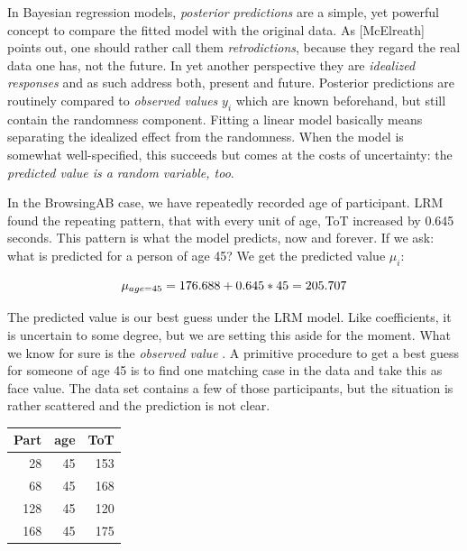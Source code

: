\documentclass[]{svmono}
\newenvironment{Shaded}{\begin{snugshade}}{\end{snugshade}}
\newcommand{\KeywordTok}[1]{\textcolor[rgb]{0.13,0.29,0.53}{\textbf{#1}}}
\newcommand{\DecValTok}[1]{\textcolor[rgb]{0.00,0.00,0.81}{#1}}
\newcommand{\StringTok}[1]{\textcolor[rgb]{0.31,0.60,0.02}{#1}}
\newcommand{\OperatorTok}[1]{\textcolor[rgb]{0.81,0.36,0.00}{\textbf{#1}}}
\newcommand{\NormalTok}[1]{#1}
\theoremstyle{definition}
\theoremstyle{definition}
\theoremstyle{definition}
\theoremstyle{remark}
\begin{document}
In Bayesian regression models, \emph{posterior predictions} are a
simple, yet powerful concept to compare the fitted model with the
original data. As {[}McElreath{]} points out, one should rather call
them \emph{retrodictions}, because they regard the real data one has,
not the future. In yet another perspective they are \emph{idealized
responses} and as such address both, present and future. Posterior
predictions are routinely compared to \emph{observed values} \(y_i\)
which are known beforehand, but still contain the randomness component.
Fitting a linear model basically means separating the idealized effect
from the randomness. When the model is somewhat well-specified, this
succeeds but comes at the costs of uncertainty: the \emph{predicted
value is a random variable, too}.

In the BrowsingAB case, we have repeatedly recorded age of participant.
LRM found the repeating pattern, that with every unit of age, ToT
increased by 0.645 seconds. This pattern is what the model predicts, now
and forever. If we ask: what is predicted for a person of age 45? We get
the predicted value \(\mu_i\):

\[\mu_{age = 45} =176.688 + 0.645 * 45\\ 
= 205.707\]

The predicted value is our best guess under the LRM model. Like
coefficients, it is uncertain to some degree, but we are setting this
aside for the moment. What we know for sure is the \emph{observed value}
. A primitive procedure to get a best guess for someone of age 45 is to
find one matching case in the data and take this as face value. The data
set contains a few of those participants, but the situation is rather
scattered and the prediction is not clear.

\begin{Shaded}
\end{Shaded}

\begin{tabular}{r|r|r}
\hline
Part & age & ToT\\
\hline
28 & 45 & 153\\
\hline
68 & 45 & 168\\
\hline
128 & 45 & 120\\
\hline
168 & 45 & 175\\
\hline
\end{tabular}
\end{document}
